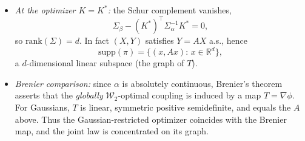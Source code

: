 \documentclass[11pt,a4paper]{article}
\theoremstyle{exostyle}
\newcommand{\R}{\mathbb{R}}
\newcommand{\Wtwo}{\mathcal{W}_2}
\begin{document}
\begin{solution}
\begin{itemize}[itemsep=2pt]
\item \emph{At the optimizer $K=K^*$:} the Schur complement vanishes,
\[
\Sigma_\beta-(K^*)^\top\Sigma_\alpha^{-1}K^*=0,
\]
so $\mathrm{rank}(\Sigma)=d$. In fact $(X,Y)$ satisfies $Y=AX$ a.s., hence
\[
\mathrm{supp}(\pi)=\{(x,Ax):\,x\in\R^d\},
\]
a $d$-dimensional linear subspace (the graph of $T$).

\item \emph{Brenier comparison:} since $\alpha$ is absolutely continuous, Brenier's theorem asserts that the \emph{globally} $\Wtwo$-optimal coupling is induced by a map $T=\nabla\phi$. For Gaussians, $T$ is linear, symmetric positive semidefinite, and equals the $A$ above. Thus the Gaussian-restricted optimizer coincides with the Brenier map, and the joint law is concentrated on its graph.
\end{itemize}
\end{solution}
\end{document}
